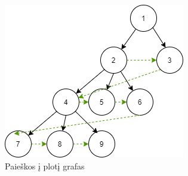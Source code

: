 \begin{figure}[htp!]
\centering
\includegraphics[scale=0.7]{img/BFS.png}
\caption{Paieškos į plotį grafas}
\label{fig:bfs}
\end{figure}